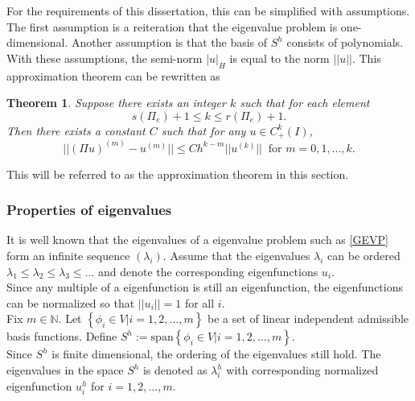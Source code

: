 \documentclass[../../main.tex]{subfiles}
\begin{document}
For the requirements of this dissertation, this can be simplified with assumptions. The first assumption is a reiteration that the eigenvalue problem is one-dimensional. Another assumption is that the basis of $S^h$ consists of polynomials. With these assumptions, the semi-norm $|u|_H$ is equal to the norm $||u||$. This approximation theorem can be rewritten as
\newtheorem{Interpolation_2}{Theorem}
\begin{Interpolation_2}
	Suppose there exists an integer $k$ such that for each element
	\begin{equation*}
		s(\Pi_e) + 1 \leq k \leq r(\Pi_e) +1.
	\end{equation*}
	Then there exists a constant $C$ such that for any $u \in C^k_+(I)$,
	\begin{equation*}
		||(\Pi u)^{(m)} - u^{(m)}|| \leq C h^{k-m} || u^{(k)}|| \ \text{ for } m = 0,1,...,k.
	\end{equation*}
\end{Interpolation_2}

This will be referred to as the approximation theorem in this section.\\

\subsubsection*{Properties of eigenvalues}

It is well known that the eigenvalues of a eigenvalue problem such as \eqref{GEVP} form an infinite sequence $(\lambda_i)$. Assume that the eigenvalues $\lambda_i$ can be ordered $\lambda_1 \leq \lambda_2 \leq \lambda_3 \leq ...$ and denote the corresponding eigenfunctions $u_i$.\\

Since any multiple of a eigenfunction is still an eigenfunction, the eigenfunctions can be normalized so that $||u_i|| = 1$ for all $i$.\\

Fix $m \in \mathbb{N}$. \label{sym:natural} Let $\left\{ \phi_i \in V | i = 1,2,...,m \right\}$ be a set of linear independent admissible basis functions. Define $S^h := \text{span}\left\{\phi_i \in V | i = 1,2,...,m\right\}$.\\

Since $S^h$ is finite dimensional, the ordering of the eigenvalues still hold. The eigenvalues in the space $S^h$ is denoted as $\lambda_i^h$ with corresponding normalized eigenfunction $u^h_i$ for $i = 1,2,...,m$.\\
\end{document}
